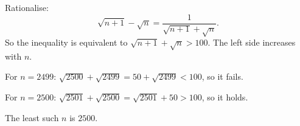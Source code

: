 Rationalise:
\[
\sqrt{n+1}-\sqrt n=\dfrac{1}{\sqrt{n+1}+\sqrt n}.
\]
So the inequality is equivalent to $\sqrt{n+1}+\sqrt n>100$. The left side increases with $n$.

For $n=2499$: $\sqrt{2500}+\sqrt{2499}=50+\sqrt{2499}<100$, so it fails.

For $n=2500$: $\sqrt{2501}+\sqrt{2500}=\sqrt{2501}+50>100$, so it holds.

The least such $n$ is $\boxed{2500}$.
